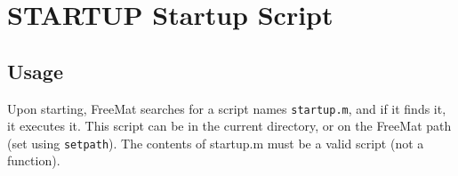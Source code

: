 \section{STARTUP Startup Script}

\subsection{Usage}

Upon starting, FreeMat searches for a script names \verb|startup.m|, and
if it finds it, it executes it.  This script can be in the current
directory, or on the FreeMat path (set using \verb|setpath|).  The contents
of startup.m must be a valid script (not a function).  
